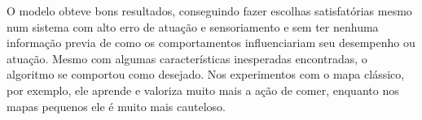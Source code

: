 O modelo obteve bons resultados, conseguindo fazer escolhas satisfatórias mesmo num sistema com alto erro de atuação e sensoriamento e sem ter nenhuma informação previa de como os comportamentos influenciariam seu desempenho ou atuação. Mesmo com algumas características inesperadas encontradas, o algoritmo se comportou como desejado. Nos experimentos com o mapa clássico, por exemplo, ele aprende e valoriza muito mais a ação de comer, enquanto nos mapas pequenos ele é muito mais cauteloso.
